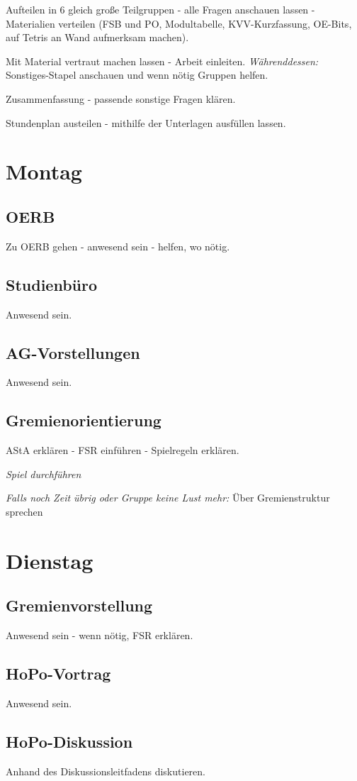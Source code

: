 \documentclass[10pt,a4paper,oneside,ngerman,numbers=noenddot]{scrartcl}
\begin{document}
	Aufteilen in 6 gleich große Teilgruppen - alle Fragen anschauen lassen - Materialien verteilen (FSB und PO, Modultabelle, KVV-Kurzfassung, OE-Bits, auf Tetris an Wand aufmerksam machen).
	
	Mit Material vertraut machen lassen - Arbeit einleiten. \textit{Währenddessen:} Sonstiges-Stapel anschauen und wenn nötig Gruppen helfen.
	
	Zusammenfassung - passende sonstige Fragen klären.
	
	Stundenplan austeilen - mithilfe der Unterlagen ausfüllen lassen.	
\section{Montag}
	\subsection{OERB}
		Zu OERB gehen - anwesend sein - helfen, wo nötig.
	\subsection{Studienbüro}
		Anwesend sein.
	\subsection{AG-Vorstellungen}
		Anwesend sein.
	\subsection{Gremienorientierung}
		AStA erklären - FSR einführen - Spielregeln erklären.
		
		\textit{Spiel durchführen}
		
		\textit{Falls noch Zeit übrig oder Gruppe keine Lust mehr:} Über Gremienstruktur sprechen
	
\section{Dienstag}
	\subsection{Gremienvorstellung}
		Anwesend sein - wenn nötig, FSR erklären.
	\subsection{HoPo-Vortrag}
		Anwesend sein.
	\subsection{HoPo-Diskussion}
		Anhand des Diskussionsleitfadens diskutieren.
\end{document}
